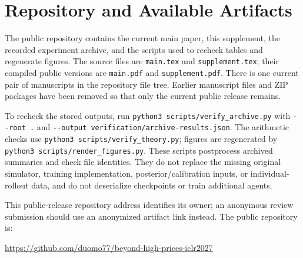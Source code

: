 \documentclass{article}
\begin{document}
\clearpage
\section{Repository and Available Artifacts}\label{app:repository}

The public repository contains the current main paper, this supplement, the recorded experiment archive, and the scripts used to recheck tables and regenerate figures. The source files are \texttt{main.tex} and \texttt{supplement.tex}; their compiled public versions are \texttt{main.pdf} and \texttt{supplement.pdf}. There is one current pair of manuscripts in the repository file tree. Earlier manuscript files and ZIP packages have been removed so that only the current public release remains.

To recheck the stored outputs, run \texttt{python3 scripts/verify\_archive.py} with \texttt{-\/-root .} and \texttt{-\/-output verification/archive-results.json}. The arithmetic checks use \texttt{python3 scripts/verify\_theory.py}; figures are regenerated by \texttt{python3 scripts/render\_figures.py}. These scripts postprocess archived summaries and check file identities. They do not replace the missing original simulator, training implementation, posterior/calibration inputs, or individual-rollout data, and do not deserialize checkpoints or train additional agents.

This public-release repository address identifies its owner; an anonymous review submission should use an anonymized artifact link instead. The public repository is:

\url{https://github.com/duomo77/beyond-high-prices-iclr2027}
\end{document}
